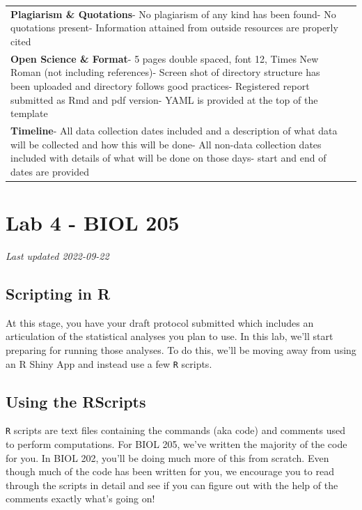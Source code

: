 \documentclass[
]{book}
\begin{document}
\begin{longtable}[]{@{}
  >{\raggedright\arraybackslash}p{}
  >{\raggedright\arraybackslash}p{}@{}}
\textbf{Plagiarism \& Quotations}- No plagiarism of any kind has been found- No quotations present- Information attained from outside resources are properly cited & 3 \\
\textbf{Open Science \& Format}- 5 pages double spaced, font 12, Times New Roman (not including references)- Screen shot of directory structure has been uploaded and directory follows good practices- Registered report submitted as Rmd and pdf version- YAML is provided at the top of the template & 4 \\
\textbf{Timeline}- All data collection dates included and a description of what data will be collected and how this will be done- All non-data collection dates included with details of what will be done on those days- start and end of dates are provided & 3 \\
\bottomrule()
\end{longtable}

\hypertarget{part-lab-4---biol-205}{%
\part*{Lab 4 - BIOL 205}\label{part-lab-4---biol-205}}

\emph{Last updated 2022-09-22}

\hypertarget{scripting-in-r}{%
\chapter*{Scripting in R}\label{scripting-in-r}}

At this stage, you have your draft protocol submitted which includes an articulation of the statistical analyses you plan to use. In this lab, we'll start preparing for running those analyses. To do this, we'll be moving away from using an R Shiny App and instead use a few \texttt{R} scripts.

\hypertarget{using-the-rscripts}{%
\chapter*{Using the RScripts}\label{using-the-rscripts}}

\texttt{R} scripts are text files containing the commands (aka code) and comments used to perform computations. For BIOL 205, we've written the majority of the code for you. In BIOL 202, you'll be doing much more of this from scratch. Even though much of the code has been written for you, we encourage you to read through the scripts in detail and see if you can figure out with the help of the comments exactly what's going on!
\end{document}
